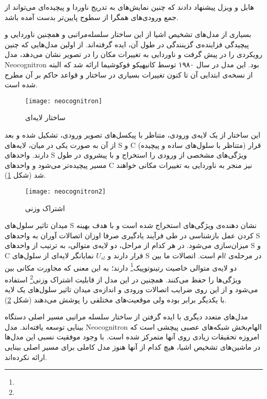 هابل و ویزل پیشنهاد دادند که چنین نمایش‌های به تدریج ناوردا و پیچیده‌ای می‌تواند از جمع ورودی‌های همگرا از سطوح پایین‌تر بدست آمده باشد. 

بسیاری از مدل‌های تشخیص اشیا از این ساختار سلسله‌مراتبی و همچنین ناوردایی و پیچیدگی فزاینده‌ی گزینندگی در طول آن، ایده گرفته‌اند. از اولین مدل‌هایی که چنین رویکردی را در پیش گرفت و ناوردایی به تغییرات مکان را در تصویر نشان می‌دهد، مدل Neocognitron بود. این مدل در سال ۱۹۸۰ توسط کانیهیکو فوکوشیما ارائه شد\cite{fukushima1980neocognitron} که البته از نسخه‌ی ابتدایی آن تا کنون تغییرات بسیاری در ساختار و قواعد حاکم بر آن مطرح شده است. 

\begin{figure}
\centering
{\footnotesize
\texttt{[image: neocognitron]}
\caption{ساختار لایه‌ای \cite{fukushima1980neocognitron}}
\label{fig:neocognitron}
}
\end{figure}

این ساختار از یک لایه‌ی ورودی، متناظر با پیکسل‌های تصویر ورودی، تشکیل شده و بعد از آن به صورت یکی در میان، لایه‌های S و C (متناظر با سلول‌های ساده و پیچیده) قرار دارند. واحد‌های S ویژگی‌های مشخصی از ورودی را استخراج و با پیشروی در طول مسیر پیچیده‌تر می‌شود و واحد‌های C نیز منجر به ناوردایی به تغییرات مکانی خواهند شد (شکل \ref{fig:neocognitron}). 

\begin{figure}
\centering
{\footnotesize
\texttt{[image: neocognitron2]}
\caption{اشتراک وزنی}
\label{fig:neocognitron2}
}
\end{figure}

میدان تاثیر سلول‌های S نشان دهنده‌ی ویژگی‌های استخراج شده است و با هدف بهینه کردن عمل بازشناسی در طی فرآیند یادگیری صرفا اوزان اتصالات آوران به واحد‌های S میزان‌سازی می‌شود. در هر کدام از مراحل، دو لایه‌ی متوالی، به ترتیب از واحد‌های S و C قرار دارند و $U_{sl}$ نمایانگر لایه‌ای از سلول‌های S در مرحله‌ی $l$ام است. اتصالات ما بین دو لایه‌ی متوالی خاصیت رتینوتوپیک\footnote{} دارند؛ به این معنی که مجاورت مکانی بین ویژگی‌ها را حفظ می‌کنند. همچنین در این مدل از قابلیت اشتراک وزنی\footnote{} استفاده می‌شود و از این روی ضرایب اتصالات ورودی و اندازه‌ی میدان تاثیر سلول‌های یک لایه با یکدیگر برابر بوده ولی موقعیت‌های مختلفی را پوشش می‌دهند (شکل \ref{fig:neocognitron2}). 

مدل‌های متعدد دیگری با ایده گرفتن از ساختار سلسله مراتبی مسیر اصلی دستگاه بینایی توسعه یافته‌اند. مدل Neocognitron الهام‌بخش شبکه‌های عصبی پیچشی است که امروزه تحقیقات زیادی روی آنها متمرکز شده است. با وجود موفقیت نسبی این مدل‌ها در ماشین‌های تشخیص اشیا، هیچ کدام از آنها هنوز مدل کاملی برای مسیر اصلی بینایی ارائه نکرده‌اند.

